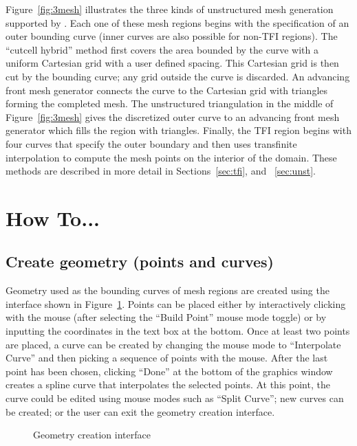 \documentclass[letterpaper,12pt]{article}
\begin{document}
Figure~\ref{fig:3mesh} illustrates the three kinds of unstructured
mesh generation supported by \smesh.  Each one of these mesh regions
begins with the specification of an outer bounding curve (inner curves
are also possible for non-{TFI} regions).  The ``cutcell hybrid''
method first covers the area bounded by the curve with a uniform
Cartesian grid with a user defined spacing.  This Cartesian grid is
then cut by the bounding curve; any grid outside the curve is
discarded.  An advancing front mesh generator connects the curve to
the Cartesian grid with triangles forming the completed mesh.  The
unstructured triangulation in the middle of Figure~\ref{fig:3mesh}
gives the discretized outer curve to an advancing front mesh generator
which fills the region with triangles.  Finally, the {TFI} region
begins with four curves that specify the outer boundary and then uses
transfinite interpolation to compute the mesh points on the interior
of the domain.  These methods are described in more detail in Sections~\ref{sec:tfi},
and ~\ref{sec:unst}.

\section{How To...}
\subsection{Create geometry (points and curves)}\label{sec:curve}
Geometry used as the bounding curves of mesh regions are created using
the interface shown in Figure~\ref{fig:geom}.  Points can be placed
either by interactively clicking with the mouse (after selecting the
``Build Point'' mouse mode toggle) or by inputting the coordinates in
the text box at the bottom.  Once at least two points are placed, a
curve can be created by changing the mouse mode to ``Interpolate
Curve'' and then picking a sequence of points with the mouse.  After
the last point has been chosen, clicking ``Done'' at the bottom of the
graphics window creates a spline curve that interpolates the selected
points.  At this point, the curve could be edited using mouse modes
such as ``Split Curve''; new curves can be created; or the user can
exit the geometry creation interface.
\begin{figure}
\begin{center}
\end{center}
\caption{Geometry creation interface}\label{fig:geom}
\end{figure}
\end{document}
